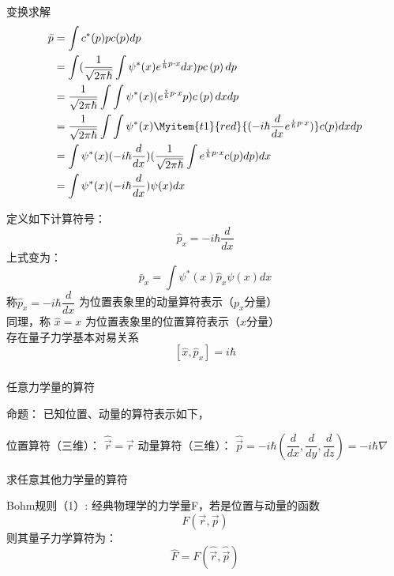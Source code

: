 \begin{frame}
变换求解
\begin{equation*}
    \begin{split}
        \bar{p}&=\int c^{*}(p) p c(p) d p \\  
        &=\int (\frac{1}{\sqrt{2 \pi \hbar}} \int \psi^{*}(x) e^{\frac{i}{\hbar} p\cdot x} d x) p c\left(p\right) d p \\
        &=\frac{1}{\sqrt{2 \pi \hbar}} \int \int \psi^{*}(x) (e^{\frac{i}{\hbar} p\cdot x}  p) c\left(p\right) d xd p \\
        &=\frac{1}{\sqrt{2 \pi \hbar}} \int \int \psi^{*}(x) \Myitem{t1}{red}{(-i\hbar\frac{d}{d x} e^{\frac{i}{\hbar} p\cdot x})} c(p) d xd p \\
        &=\int \psi^{*}(x) (-i\hbar\frac{d}{d x}) (\frac{1}{\sqrt{2 \pi \hbar}} \int e^{\frac{i}{\hbar} p\cdot x} c(p) d p)  d x\\
        &=\int \psi^{*}(x) (-i\hbar\frac{d}{d x}) \psi(x)  d x\\
     \end{split}
\end{equation*}  
\end{frame} 

\begin{frame}
定义如下计算符号：
$$ \boxed{\hat{p}_x= -i\hbar\frac{d}{d x}} $$ 
上式变为：         
$$\boxed{\bar{p}_x=\int \psi^{*}(x) \hat{p}_x \psi(x) d x} $$
称$ \hat{p}_x= -i\hbar\dfrac{d}{d x} $ 为位置表象里的动量算符表示（$p_x$分量）\\
同理，称 $\hat{x}= x $ 为位置表象里的位置算符表示（$x$分量）\\ \vspace{0.3em}
存在量子力学基本对易关系 \[ [\hat{x},\hat{p}_x]=i\hbar\] 
\end{frame}

\begin{frame} 
    \frametitle{}
    {\Bullet} 任意力学量的算符
    \begin{tcolorbox1}{命题：}
    已知位置、动量的算符表示如下，
    \begin{itemize}
        \Item  位置算符（三维）： $ \hat{\vec{r}} =\vec{r} $
        \Item  动量算符（三维）： $ \hat{\vec{p}} =-i\hbar(\dfrac{d}{d x}, \dfrac{d}{d y} , \dfrac{d}{d z})=-i\hbar \nabla $
    \end{itemize}
    求任意其他力学量的算符
    \end{tcolorbox1}
    \alert{Bohm规则（1）:} 经典物理学的力学量F，若是位置与动量的函数
    \[F(\vec{r},\vec{p})\]
    则其量子力学算符为：
    \[\hat{F}=F(\hat{\vec{r}},\hat{\vec{p}})\]
\end{frame} 

